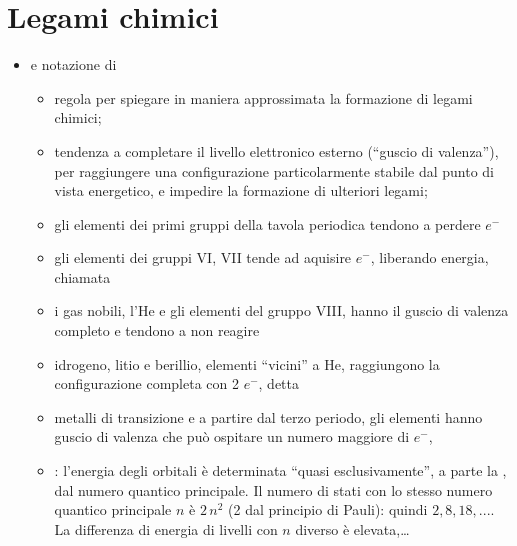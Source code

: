 \documentclass[letterpaper,10pt,english]{jupyterBook}
\begin{document}
\section{Legami chimici}
\label{\detokenize{ch/units:legami-chimici}}\begin{itemize}
\item {} 
\sphinxAtStartPar
{} e notazione di 
\begin{itemize}
\item {} 
\sphinxAtStartPar
regola per spiegare in maniera approssimata la formazione di legami chimici;

\item {} 
\sphinxAtStartPar
tendenza a completare il livello elettronico esterno (“guscio di valenza”), per raggiungere una configurazione particolarmente stabile dal punto di vista energetico, e impedire la formazione di ulteriori legami;

\item {} 
\sphinxAtStartPar
gli elementi dei primi gruppi della tavola periodica tendono a perdere \(e^-\)

\item {} 
\sphinxAtStartPar
gli elementi dei gruppi VI, VII tende ad aquisire \(e^-\), liberando energia, chiamata 

\item {} 
\sphinxAtStartPar
i gas nobili, l’He e gli elementi del gruppo VIII, hanno il guscio di valenza completo e tendono a non reagire

\item {} 
\sphinxAtStartPar
idrogeno, litio e berillio, elementi “vicini” a He, raggiungono la configurazione completa con 2 \(e^-\), detta 

\item {} 
\sphinxAtStartPar
metalli di transizione e a partire dal terzo periodo, gli elementi hanno guscio di valenza che può ospitare un numero maggiore di \(e^-\), 

\item {} 
\sphinxAtStartPar
{}: l’energia degli orbitali è determinata “quasi esclusivamente”, a parte la , dal numero quantico principale. Il numero di stati con lo stesso numero quantico principale \(n\) è \(2 \, n^2\) (2 dal principio di Pauli): quindi \(2, 8, 18,...\). La differenza di energia di livelli con \(n\) diverso è elevata,… 


\end{itemize}
\end{itemize}
\end{document}
